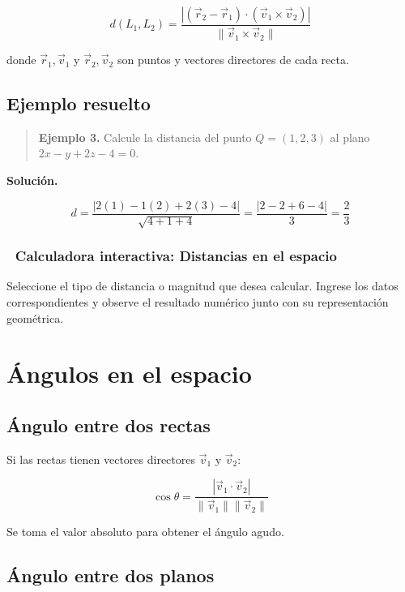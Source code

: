 \documentclass[
]{book}
\begin{document}
\[
d(L_1, L_2) = \frac{|(\vec{r}_2 - \vec{r}_1) \cdot (\vec{v}_1 \times \vec{v}_2)|}{\|\vec{v}_1 \times \vec{v}_2\|}
\]

donde \(\vec{r}_1, \vec{v}_1\) y \(\vec{r}_2, \vec{v}_2\) son puntos y vectores directores de cada recta.

\subsection{Ejemplo resuelto}\label{ejemplo-resuelto-4}

\begin{quote}
\textbf{Ejemplo 3.} Calcule la distancia del punto \(Q = (1, 2, 3)\) al plano \(2x - y + 2z - 4 = 0\).
\end{quote}

\textbf{Solución.}

\[
d = \frac{|2(1) - 1(2) + 2(3) - 4|}{\sqrt{4 + 1 + 4}} = \frac{|2 - 2 + 6 - 4|}{3} = \frac{2}{3}
\]

\subsubsection{🧮 Calculadora interactiva: Distancias en el espacio}\label{calculadora-interactiva-distancias-en-el-espacio}

Seleccione el tipo de distancia o magnitud que desea calcular. Ingrese los datos correspondientes y observe el resultado numérico junto con su representación geométrica.

\section{Ángulos en el espacio}\label{uxe1ngulos-en-el-espacio}

\subsection{Ángulo entre dos rectas}\label{uxe1ngulo-entre-dos-rectas}

Si las rectas tienen vectores directores \(\vec{v}_1\) y \(\vec{v}_2\):

\[
\cos\theta = \frac{|\vec{v}_1 \cdot \vec{v}_2|}{\|\vec{v}_1\| \|\vec{v}_2\|}
\]

Se toma el valor absoluto para obtener el ángulo agudo.

\subsection{Ángulo entre dos planos}\label{uxe1ngulo-entre-dos-planos}
\end{document}

